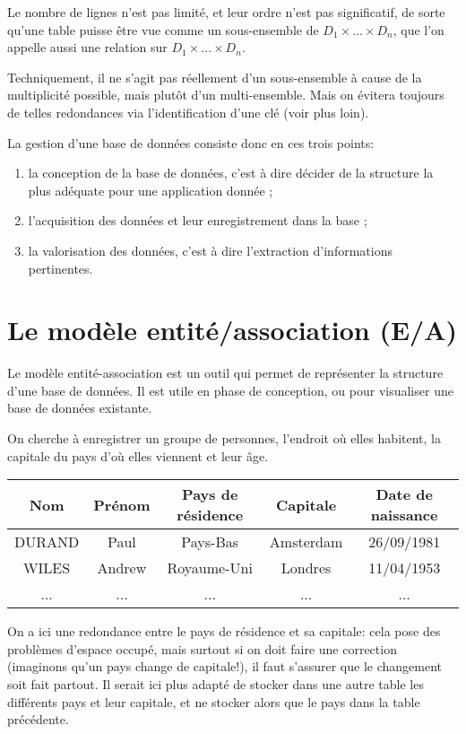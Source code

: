 \documentclass{scrartcl}
\begin{document}
		Le nombre de lignes n'est pas limité, et leur ordre n'est pas significatif, de sorte qu'une table puisse être vue 
		comme un sous-ensemble de $D_1\times...\times D_n$, que l'on appelle aussi une relation sur $D_1\times...\times D_n$.
		
		\rem Techniquement, il ne s'agit pas réellement d'un sous-ensemble à cause de la multiplicité possible, mais plutôt d'un multi-ensemble.
		Mais on évitera toujours de telles redondances via l'identification d'une clé (voir plus loin).

		La gestion d'une base de données consiste donc en ces trois points:
		\begin{enumerate}
			\item la conception de la base de données, c'est à dire décider de la structure la plus adéquate pour une application donnée ;
			\item l'acquisition des données et leur enregistrement dans la base ;
			\item la valorisation des données, c'est à dire l'extraction d'informations pertinentes.
		\end{enumerate}

	\section{Le modèle entité/association (E/A)}
		Le modèle entité-association est un outil qui permet de représenter la structure d'une base de données. 
		Il est utile en phase de conception, ou pour visualiser une base de données existante.

		\exemple On cherche à enregistrer un groupe de personnes, l'endroit où elles habitent, la capitale du pays d'où elles viennent et leur âge.

		\begin{center}
		\begin{tabular}{|c|c|c|c|c|}
			\hline
			Nom & Prénom & Pays de résidence & Capitale & Date de naissance \\
			\hline
			DURAND & Paul & Pays-Bas & Amsterdam & 26/09/1981 \\
			\hline
			WILES & Andrew & Royaume-Uni & Londres & 11/04/1953 \\
			\hline
			... & ... & ... & ... & ... \\
			\hline
		\end{tabular}
		\end{center}

		\rem On a ici une redondance entre le pays de résidence et sa capitale: cela pose des problèmes d'espace occupé,
		mais surtout si on doit faire une correction (imaginons qu'un pays change de capitale!), il faut s'assurer que
		le changement soit fait partout. Il serait ici plus adapté de stocker dans une autre table les différents pays
		et leur capitale, et ne stocker alors que le pays dans la table précédente.
\end{document}
